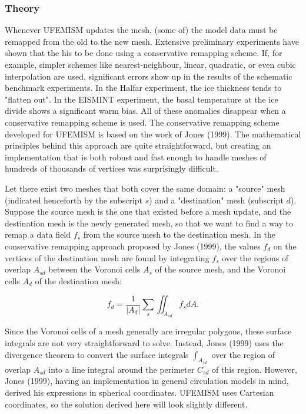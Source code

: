 \documentclass{article}
\begin{document}
\subsubsection{Theory}

Whenever UFEMISM updates the mesh, (some of) the model data must be remapped from the old to the new mesh. Extensive preliminary experiments have shown that the his to be done using a conservative remapping scheme. If, for example, simpler schemes like nearest-neighbour, linear, quadratic, or even cubic interpolation are used, significant errors show up in the results of the schematic benchmark experiments. In the Halfar experiment, the ice thickness tends to "flatten out". In the EISMINT experiment, the basal temperature at the ice divide shows a significant warm bias. All of these anomalies disappear when a conservative remapping scheme is used. The conservative remapping scheme developed for UFEMISM is based on the work of Jones (1999). The mathematical principles behind this approach are quite straightforward, but creating an implementation that is both robust and fast enough to handle meshes of hundreds of thousands of vertices was surprisingly difficult.

Let there exist two meshes that both cover the same domain: a "source" mesh (indicated henceforth by the subscript $s$) and a "destination" mesh (subscript $d$). Suppose the source mesh is the one that existed before a mesh update, and the destination mesh is the newly generated mesh, so that we want to find a way to remap a data field $f_s$ from the source mesh to the destination mesh. In the conservative remapping approach proposed by Jones (1999), the values $f_d$ on the vertices of the destination mesh are found by integrating $f_s$ over the regions of overlap $A_{sd}$ between the Voronoi cells $A_s$ of the source mesh, and the Voronoi cells $A_d$ of the destination mesh:

\begin{equation} \label{eq:remap_sumint}
f_d = \frac{1}{|A_d|} \sum_s \iint_{A_{sd}} f_s dA.
\end{equation}

Since the Voronoi cells of a mesh generally are irregular polygons, these surface integrals are not very straightforward to solve. Instead, Jones (1999) uses the divergence theorem to convert the surface integrals $\int_{A_{sd}}$ over the region of overlap $A_{sd}$ into a line integral around the perimeter $C_{sd}$ of this region. However, Jones (1999), having an implementation in general circulation models in mind, derived his expressions in spherical coordinates. UFEMISM uses Cartesian coordinates, so the solution derived here will look slightly different.
\end{document}
